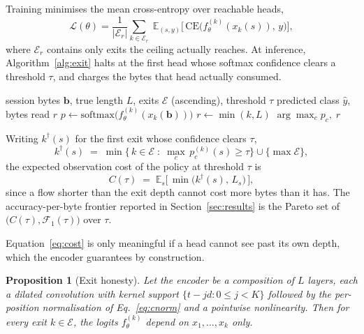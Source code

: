 \documentclass[pdflatex,sn-mathphys-num]{sn-jnl}
\theoremstyle{thmstyleone}%
\newtheorem{proposition}{Proposition}%
\theoremstyle{thmstylethree}%
\begin{document}
Training minimises the mean cross-entropy over reachable heads,
\begin{equation}
\mathcal{L}(\theta) = \frac{1}{|\mathcal{E}_r|}
\sum_{k \in \mathcal{E}_r} \;
\mathbb{E}_{(s,y)} \big[\, \mathrm{CE}\big(f^{(k)}_\theta(x_k(s)),\, y \big) \big],
\label{eq:loss}
\end{equation}
where $\mathcal{E}_r$ contains only exits the ceiling actually reaches.
At inference, Algorithm~\ref{alg:exit} halts at the first head whose softmax
confidence clears a threshold $\tau$, and charges the bytes that head actually
consumed.

\begin{algorithm}[tbp]
\caption{Confidence-thresholded early exit}\label{alg:exit}
\begin{algorithmic}[1]
\Require session bytes $\mathbf{b}$, true length $L$, exits $\mathcal{E}$
(ascending), threshold $\tau$
\Ensure predicted class $\hat{y}$, bytes read $r$
  \State $p \gets \mathrm{softmax}\big(f^{(k)}_\theta(x_k(\mathbf{b}))\big)$
  \State $r \gets \min(k, L)$ 
     \State \Return $\arg\max_c p_c,\; r$
  \EndIf
\EndFor
\end{algorithmic}
\end{algorithm}

Writing $k^{\dagger}(s)$ for the first exit whose confidence clears $\tau$,
\begin{equation}
k^{\dagger}(s) \;=\; \min\Big\{\, k \in \mathcal{E} \;:\;
\max_{c} \, p^{(k)}_{c}(s) \ge \tau \Big\} \cup \{\max \mathcal{E}\},
\label{eq:exit}
\end{equation}
the expected observation cost of the policy at threshold $\tau$ is
\begin{equation}
C(\tau) \;=\; \mathbb{E}_{s}\big[\, \min\big(k^{\dagger}(s),\, L_s\big) \,\big],
\label{eq:cost}
\end{equation}
since a flow shorter than the exit depth cannot cost more bytes than it has.
The accuracy-per-byte frontier reported in Section~\ref{sec:results} is the
Pareto set of $\big(C(\tau), \mathcal{F}_1(\tau)\big)$ over $\tau$.

Equation~\eqref{eq:cost} is only meaningful if a head cannot see past its own
depth, which the encoder guarantees by construction.

\begin{proposition}[Exit honesty]\label{prop:causal}
Let the encoder be a composition of $L$ layers, each a dilated convolution
with kernel support $\{t - jd : 0 \le j < K\}$ followed by the per-position
normalisation of Eq.~\eqref{eq:cnorm} and a pointwise nonlinearity. Then for
every exit $k \in \mathcal{E}$, the logits $f^{(k)}_\theta$ depend on
$x_1,\dots,x_k$ only.
\end{proposition}
\end{document}
